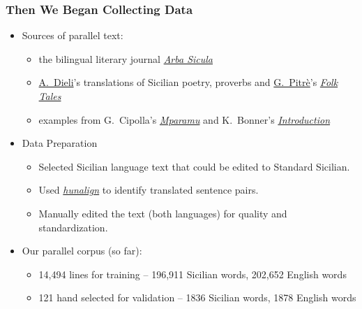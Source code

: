 \documentclass{beamer}
\begin{document}
\begin{frame}
  \frametitle{Then We Began Collecting Data}
  \vspace{-1.0em}
  \begin{itemize}
  \item Sources of parallel text:
    \begin{itemize}
    \item the bilingual literary journal \href{https://www.arbasicula.org/}{\textit{Arba Sicula}}
    \item \href{http://www.dieli.net/}{A.~Dieli}'s translations of Sicilian poetry, proverbs and \href{https://en.wikipedia.org/wiki/Giuseppe_Pitr\%C3\%A8}{G.~Pitrè}'s \href{https://scn.wikipedia.org/wiki/F\%C3\%A0uli,_nueddi_e_cunti_pupulari_siciliani}{\textit{Folk Tales}}
    \item examples from G.~Cipolla's \href{http://www.arbasicula.org/LegasOnlineStore.html\#!/26-Learn-Sicilian-Mparamu-lu-sicilianu-by-Gaetano-Cipolla/p/82865121/category=0}{\textit{Mparamu}} and K.~Bonner's \href{http://www.arbasicula.org/LegasOnlineStore.html\#!/28-An-Introduction-to-Sicilian-Grammar-by-J-K-Kirk-Bonner-Edited-by-Gaetano-Cipolla/p/82865123/category=0}{\textit{Introduction}}
   \end{itemize}
  \vspace{0.5em}
  \item Data Preparation
    \begin{itemize}
    \item Selected Sicilian language text that could be edited to Standard Sicilian.
    \item Used \href{https://github.com/danielvarga/hunalign}{\textit{hunalign}} to identify translated sentence pairs.
    \item Manually edited the text (both languages) for quality and standardization.
    \end{itemize}
  \vspace{0.5em}
  \item Our parallel corpus (so far):
    \begin{itemize}
    \item 14,494 lines for training -- 196,911 Sicilian words, 202,652 English words
    \item 121 hand selected for validation -- 1836 Sicilian words, 1878 English words
    \end{itemize}
  \end{itemize} 
\end{frame}
\end{document}
